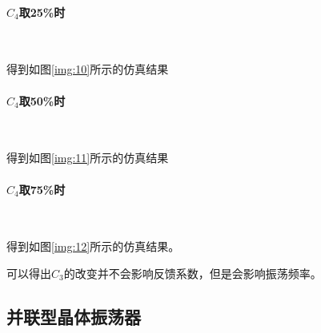 \documentclass[UTF8]{ctexart}
\begin{document}
\paragraph{$C_4$取25\%时}~{}\par
得到如图\ref{img:10}所示的仿真结果
\paragraph{$C_4$取50\%时}~{}\par
得到如图\ref{img:11}所示的仿真结果
\paragraph{$C_4$取75\%时}~{}\par
得到如图\ref{img:12}所示的仿真结果。

可以得出$C_3$的改变并不会影响反馈系数，但是会影响振荡频率。
\subsection{并联型晶体振荡器}
\end{document}
